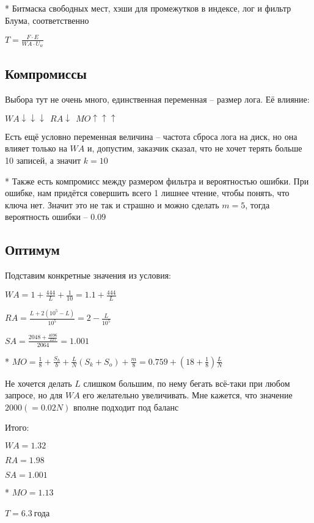 * Битмаска свободных мест, хэши для промежутков в индексе, лог и фильтр Блума, соответственно

\large$T = \frac{F\cdot E}{WA\cdot U_w}$\normalsize

\subsection*{Компромиссы}

Выбора тут не очень много, единственная переменная -- размер лога. Её влияние:

$WA\downarrow\downarrow\downarrow\ \ RA \downarrow\ \ MO \uparrow\uparrow\uparrow$

Есть ещё условно переменная величина -- частота сброса лога на диск, но она влияет только на $WA$ и, допустим, заказчик сказал, что не хочет терять больше 10 записей, а значит $k = 10$

* Также есть компромисс между размером фильтра и вероятностью ошибки. При ошибке, нам придётся совершить всего 1 лишнее чтение, чтобы понять, что ключа нет. Значит это не так и страшно и можно сделать $m = 5$, тогда вероятность ошибки -- $0.09$

\subsection*{Оптимум}

Подставим конкретные значения из условия:

\large$WA = 1 + \frac{444}{L} + \frac{1}{10} = 1.1 + \frac{444}{L}$\normalsize

\large$RA = \frac{L + 2(10^5-L)}{10^5} = 2 - \frac{L}{10^5}$\normalsize

\large$SA = \frac{2048 + \frac{4096}{225}}{2064} = 1.001$\normalsize

* \large$MO = \frac{1}{8} + \frac{S_h}{b} + \frac{L}{N}(S_k + S_o) + \frac{m}{8} = 0.759 + (18+\frac{1}{8})\frac{L}{N}$\normalsize

Не хочется делать $L$ слишком большим, по нему бегать всё-таки при любом запросе, но для $WA$ его желательно увеличивать. Мне кажется, что значение $2000 (=0.02N)$ вполне подходит под баланс

Итого:

\large$WA = 1.32$\normalsize

\large$RA = 1.98$\normalsize

\large$SA = 1.001$\normalsize

* \large$MO = 1.13$\normalsize

\large$T = 6.3\ $\normalsize года